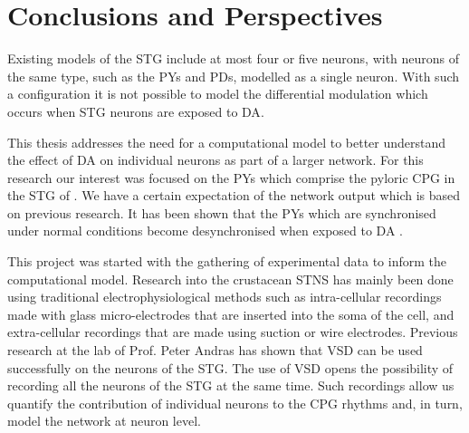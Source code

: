 \chapter{Conclusions and Perspectives}
\label{chap:conclusions_perspectives}

Existing models of the \ac{STG} include at most four or five neurons, with neurons of the same type, such as the \acp{PY} and \acp{PD}, modelled as a single neuron. With such a configuration it is not possible to model the differential modulation which occurs when \ac{STG} neurons are exposed to \ac{DA}.

This thesis addresses the need for a computational model to better understand the effect of \ac{DA} on individual neurons as part of a larger network. For this research our interest was focused on the \acp{PY} which comprise the pyloric \ac{CPG} in the \ac{STG} of . We have a certain expectation of the network output which is based on previous research. It has been shown that the \acp{PY} which are synchronised under normal conditions become desynchronised when exposed to \ac{DA} .

This project was started with the gathering of experimental data to inform the computational model. Research into the crustacean \ac{STNS} has mainly been done using traditional electrophysiological methods such as intra-cellular recordings made with glass micro-electrodes that are inserted into the soma of the cell, and extra-cellular recordings that are made using suction or wire electrodes. Previous research at the lab of Prof. Peter Andras has shown that \ac{VSD} can be used successfully on the neurons of the \ac{STG}. The use of \ac{VSD} opens the possibility of recording all the neurons of the \ac{STG} at the same time. Such recordings allow us quantify the contribution of individual neurons to the \ac{CPG} rhythms and, in turn, model the network at neuron level.

